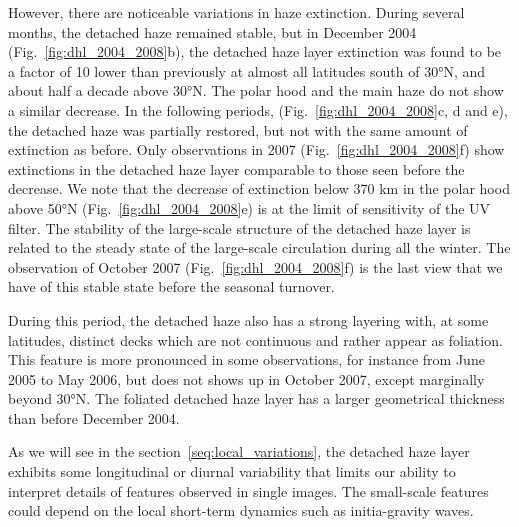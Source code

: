 However, there are noticeable variations in haze extinction. During several months, the
detached haze remained stable, but in December 2004 (Fig.~\ref{fig:dhl_2004_2008}b),
the detached haze layer extinction was found to be a factor of 10 lower than previously at almost all latitudes south
of \ang{30}N, and about half a decade above \ang{30}N. The polar hood and the main haze do not show a similar decrease.
In the following periods, (Fig.~\ref{fig:dhl_2004_2008}c, d and e),
the detached haze was partially restored, but not with the same amount of extinction as before. Only observations in
2007 (Fig.~\ref{fig:dhl_2004_2008}f) show extinctions in the detached haze layer comparable to those seen before
the decrease. We note that the decrease of extinction below 370 km in the polar hood above \ang{50}N
(Fig.~\ref{fig:dhl_2004_2008}e) is at the limit of sensitivity of the UV filter. The stability of the large-scale
structure of the detached haze layer is related to the steady state of the large-scale circulation during all the winter.
The observation of October 2007 (Fig.~\ref{fig:dhl_2004_2008}f) is the last view that we have of this stable state
before the seasonal turnover.

During this period, the detached haze also has a strong layering with, at some latitudes, distinct decks which are not
continuous and rather appear as foliation. This feature is more pronounced in some observations, for instance from
June 2005 to May 2006, but does not shows up in October 2007, except marginally beyond \ang{30}N. The foliated detached
haze layer has a larger geometrical thickness than before December 2004.

As we will see in the section~\ref{seq:local_variations}, the detached haze layer exhibits some longitudinal or diurnal variability
that limits our ability to interpret details of features observed in single images. The small-scale features
could depend on the local short-term dynamics such as initia-gravity waves.
